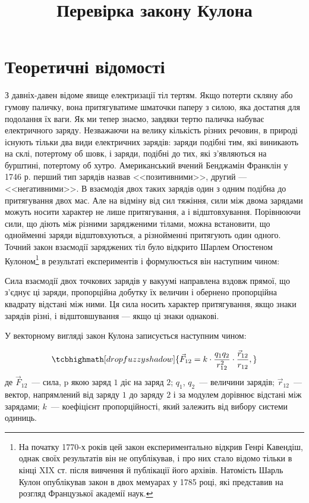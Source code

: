 \documentclass{LabWork}
\title{Перевірка закону Кулона}
\begin{document}
\writedatatofile{\jobname}
\maketitle

\section{Теоретичні відомості}

З давніх-давен відоме явище електризації тіл тертям. Якщо потерти скляну або гумову паличку, вона притягуватиме шматочки паперу з силою, яка достатня для подолання їх ваги. Як ми тепер знаємо, завдяки тертю паличка набуває електричного заряду. Незважаючи на велику кількість різних речовин, в природі існують тільки два види електричних зарядів: заряди подібні тим, які виникають на склі, потертому об шовк, і заряди, подібні до тих, які з'являються на бурштині, потертому об хутро. Американський вчений Бенджамін Франклін у 1746 р. перший тип зарядів назвав <<позитивними>>, другий --- <<негативними>>.  В взаємодія двох таких зарядів один з одним подібна до притягування двох мас. Але на відміну від сил тяжіння, сили між двома зарядами можуть носити характер не лише притягування, а і відштовхування. Порівнюючи сили, що діють між різними зарядженими тілами, можна встановити, що однойменні заряди відштовхуються, а різнойменні притягують один одного. Точний закон взаємодії заряджених тіл було відкрито Шарлем Огюстеном Кулоном\footnote{На початку 1770-х років цей закон експериментально відкрив Генрі Кавендіш, однак своїх результатів він не опублікував, і про них стало відомо тільки в кінці XIX ст. після вивчення й публікації його архівів. Натомість Шарль Кулон опублікував закон в двох мемуарах у 1785 році,  які представив на розгляд Французької академії наук.} в результаті експериментів і формулюється він наступним чином:

\begin{tcolorbox}
Сила взаємодії двох точкових зарядів у вакуумі направлена вздовж прямої, що з'єднує ці заряди, пропорційна добутку їх величин і обернено пропорційна квадрату відстані між ними. Ця сила носить характер притягування, якщо знаки зарядів різні, і відштовшування --- якщо ці знаки однакові.
\end{tcolorbox}

У векторному вигляді закон Кулона записується наступним чином:

\begin{equation}\label{key}
    \tcbhighmath[drop fuzzy shadow]{
    \vec{F}_{12}=k\cdot\frac{q_1  q_2}{r_{12}^2} \cdot \frac{\vec{r}_{12}}{r_{12}},
    }
\end{equation}
де $\vec{F}_{12}$ --- сила, p якою заряд $1$ діє на заряд $2$; $q_1$, $q_2$ --- величини зарядів; $\vec{r}_{12}$ --- вектор, напрямлений від заряду $1$ до заряду  $2$ і за модулем дорівнює відстані між зарядами; $k$ --- коефіцієнт пропорційності, який залежить від вибору системи одиниць. 
\end{document}
